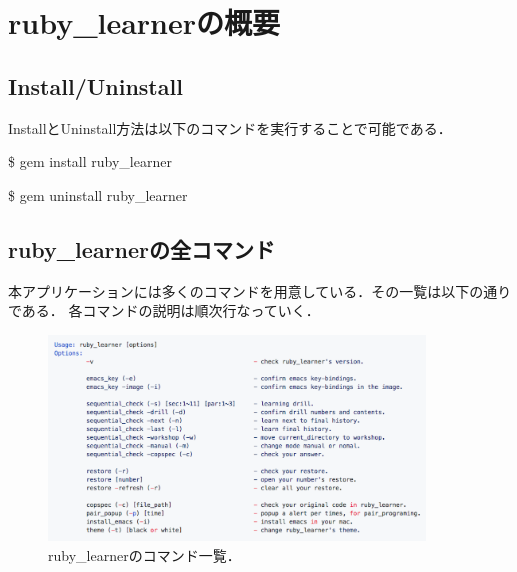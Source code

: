 
\chapter{ruby\_learnerの概要}

\section{Install/Uninstall}\label{install/uninstall}
InstallとUninstall方法は以下のコマンドを実行することで可能である．
\begin{description}
\def\labelenumi{\arabic{enumi}.}
\tightlist
\item[Install] \$ gem install ruby\_learner
\item[Uninstall] \$ gem uninstall ruby\_learner
\end{description}

\section{ruby\_learnerの全コマンド}\label{commands}
本アプリケーションには多くのコマンドを用意している．その一覧は以下の通りである．
各コマンドの説明は順次行なっていく．
\begin{figure}[H]
\centering
\begin{center}
\includegraphics[width=100mm]{../../picture/commands.png}
\end{center}
\caption{ruby\_learnerのコマンド一覧．\label{commands}}
\end{figure}

